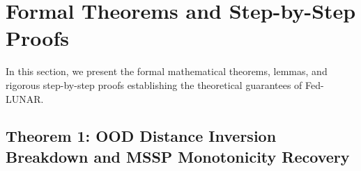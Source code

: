 
\section{Formal Theorems and Step-by-Step Proofs}
\label{sec:proofs}

In this section, we present the formal mathematical theorems, lemmas, and rigorous step-by-step proofs establishing the theoretical guarantees of Fed-LUNAR.

\subsection{Theorem 1: OOD Distance Inversion Breakdown and MSSP Monotonicity Recovery}
\label{subsec:proof_theorem1}

